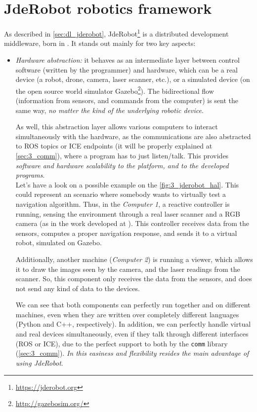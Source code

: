 \section{JdeRobot robotics framework}
	As described in \autoref{sec:dl_jderobot}, JdeRobot\footnote{\url{https://jderobot.org}} is a distributed development middleware, born in \cite{jmplaza-phd}. It stands out mainly for two key aspects:
	\begin{itemize}
		\item \textit{Hardware abstraction:} it behaves as an intermediate layer between control software (written by the programmer) and hardware, which can be a real device (a robot, drone, camera, laser scanner, etc.), or a simulated device (on the open source world simulator Gazebo\footnote{\url{http://gazebosim.org/}}). The bidirectional flow (information from sensors, and commands from the computer) is sent the same way, \textit{no matter the kind of the underlying robotic device}.
		
		As well, this abstraction layer allows various computers to interact simultaneously with the hardware, as the communications are also abstracted to ROS topics or ICE endpoints (it will be properly explained at \autoref{sec:3_comm}), where a program has to just listen/talk. This provides \textit{software and hardware scalability to the platform, and to the developed programs}.\\
		
		Let's have a look on a possible example on the \autoref{fig:3_jderobot_hal}. This could represent an scenario where somebody wants to virtually test a navigation algorithm. Thus, in the \emph{Computer 1}, a reactive controller is running, sensing the environment through a real laser scanner and a RGB camera (as in the work developed at \cite{rocapal}). This controller receives data from the sensors, computes a proper navigation response, and sends it to a virtual robot, simulated on Gazebo.
		
		Additionally, another machine (\emph{Computer 2}) is running a viewer, which allows it to draw the images seen by the camera, and the laser readings from the scanner. So, this component only receives the data from the sensors, and does not send any kind of data to the devices.
		
		We can see that both components can perfectly run together and on different machines, even when they are written over completely different languages (Python and C++, respectively). In addition, we can perfectly handle virtual and real devices simultaneously, even if they talk through different interfaces (ROS or ICE), due to the perfect support to both by the \texttt{comm}  library (\autoref{sec:3_comm}). 		 \textit{In this easiness and flexibility resides the main advantage of using JdeRobot}.\\
		

\end{itemize}
